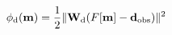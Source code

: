 \begin{equation}
\phi_{\rm d}(\mathbf{m}) = \frac{1}{2}\|\mathbf{W}_{\rm d}(F[\mathbf{m}] - \mathbf{d}_{\rm obs})\|^2
\label{eq:data_misfit}
\end{equation}
